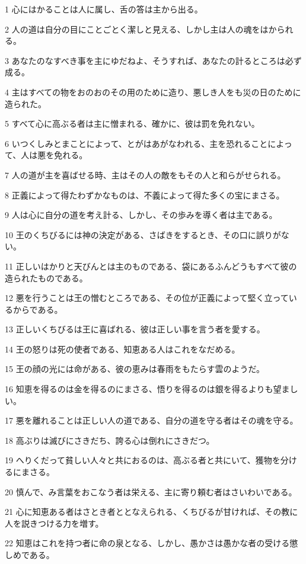 \par 1 心にはかることは人に属し、舌の答は主から出る。
\par 2 人の道は自分の目にことごとく潔しと見える、しかし主は人の魂をはかられる。
\par 3 あなたのなすべき事を主にゆだねよ、そうすれば、あなたの計るところは必ず成る。
\par 4 主はすべての物をおのおのその用のために造り、悪しき人をも災の日のために造られた。
\par 5 すべて心に高ぶる者は主に憎まれる、確かに、彼は罰を免れない。
\par 6 いつくしみとまことによって、とがはあがなわれる、主を恐れることによって、人は悪を免れる。
\par 7 人の道が主を喜ばせる時、主はその人の敵をもその人と和らがせられる。
\par 8 正義によって得たわずかなものは、不義によって得た多くの宝にまさる。
\par 9 人は心に自分の道を考え計る、しかし、その歩みを導く者は主である。
\par 10 王のくちびるには神の決定がある、さばきをするとき、その口に誤りがない。
\par 11 正しいはかりと天びんとは主のものである、袋にあるふんどうもすべて彼の造られたものである。
\par 12 悪を行うことは王の憎むところである、その位が正義によって堅く立っているからである。
\par 13 正しいくちびるは王に喜ばれる、彼は正しい事を言う者を愛する。
\par 14 王の怒りは死の使者である、知恵ある人はこれをなだめる。
\par 15 王の顔の光には命がある、彼の恵みは春雨をもたらす雲のようだ。
\par 16 知恵を得るのは金を得るのにまさる、悟りを得るのは銀を得るよりも望ましい。
\par 17 悪を離れることは正しい人の道である、自分の道を守る者はその魂を守る。
\par 18 高ぶりは滅びにさきだち、誇る心は倒れにさきだつ。
\par 19 へりくだって貧しい人々と共におるのは、高ぶる者と共にいて、獲物を分けるにまさる。
\par 20 慎んで、み言葉をおこなう者は栄える、主に寄り頼む者はさいわいである。
\par 21 心に知恵ある者はさとき者ととなえられる、くちびるが甘ければ、その教に人を説きつける力を増す。
\par 22 知恵はこれを持つ者に命の泉となる、しかし、愚かさは愚かな者の受ける懲しめである。
